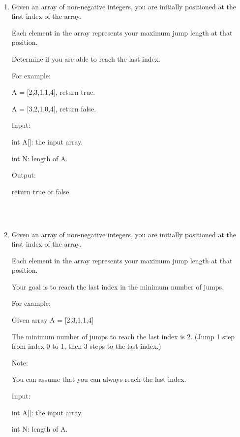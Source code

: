 \documentclass[12pt,a4paper]{article}
\begin{document}
\noindent

\noindent{}
~\\
\begin{enumerate}

\item Given an array of non-negative integers, you are initially positioned at the first index of the array.

Each element in the array represents your maximum jump length at that position.

Determine if you are able to reach the last index.

For example:

A = [2,3,1,1,4], return true.

A = [3,2,1,0,4], return false.

Input:

int A[]: the input array.

int N: length of A.

Output:

return true or false.


~\\
~\\


\item Given an array of non-negative integers, you are initially positioned at the first index of the array.

Each element in the array represents your maximum jump length at that position.

Your goal is to reach the last index in the minimum number of jumps.

For example:

Given array A = [2,3,1,1,4]

The minimum number of jumps to reach the last index is 2. (Jump 1 step from index 0 to 1, then 3 steps to the last index.)

Note:

You can assume that you can always reach the last index.

Input:

int A[]: the input array.

int N: length of A.


\end{enumerate}
\end{document}
